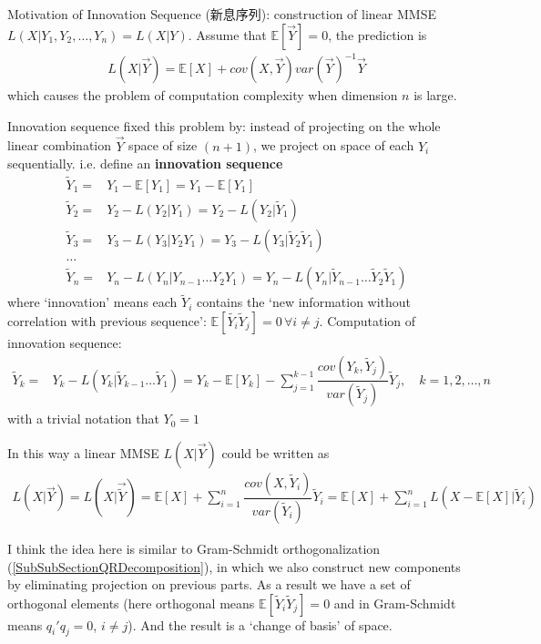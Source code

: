 Motivation of Innovation Sequence (新息序列): construction of linear MMSE $ L(X|Y_1,Y_2,\ldots,Y_n)=L(X|Y) $. Assume that $\mathbb{E}\left[ \vec{Y} \right] =0 $, the prediction is
\begin{align}
    L(X|\vec{Y})=\mathbb{E}\left[ X \right] + cov(X,\vec{Y})var(\vec{Y})^{-1}\vec{Y}
\end{align}
which causes the problem of computation complexity when dimension $ n $ is large. 

Innovation sequence fixed this problem by: instead of projecting on the whole linear combination $ \vec{Y} $ space of size $ (n+1) $, we project on space of each $ Y_i $ sequentially. i.e. define an \textbf{innovation sequence} 
\begin{align}
    \tilde{Y}_1=&Y_1-\mathbb{E}\left[ Y_1 \right] = Y_1 - \mathbb{E}\left[ Y_1 \right] \\
    \tilde{Y}_2=&Y_2-L(Y_2|Y_1) = Y_2-L(Y_2|\tilde{Y}_1)\\
    \tilde{Y}_3=&Y_3-L(Y_3|Y_2Y_1)= Y_3-L(Y_3|\tilde{Y}_2\tilde{Y}_1)\\
    \ldots&\\
    \tilde{Y}_n=&Y_n-L(Y_n|Y_{n-1}\ldots Y_2Y_1)=Y_n-L(Y_n|\tilde{Y}_{n-1}\ldots \tilde{Y}_2\tilde{Y}_1)
\end{align}
where `innovation' means each $ \tilde{Y}_i $ contains the `new information without correlation with previous sequence': $ \mathbb{E}\left[ \tilde{Y_i}\tilde{Y}_j \right]=0\,\forall i\neq j  $. Computation of innovation sequence:
\begin{align}
     \tilde{Y}_k=&Y_k-L(Y_k|\tilde{Y}_{k-1}\ldots \tilde{Y}_1)=Y_k-\mathbb{E}\left[ Y_k \right] -\sum_{j=1}^{k-1}\dfrac{cov(Y_k,\tilde{Y}_{j})}{var(\tilde{Y}_{j})}\tilde{Y}_j,\quad k=1,2,\ldots,n
\end{align}
with a trivial notation that $ Y_{0}=1 $

In this way a linear MMSE $ L(X|\vec{Y}) $ could be written as
\begin{align}
    L(X|\vec{Y})=L(X|\vec{\tilde{Y}})= \mathbb{E}\left[ X \right] +\sum_{i=1}^n \dfrac{cov(X,\tilde{Y}_i)}{var(\tilde{Y}_i)}\tilde{Y}_i=\mathbb{E}\left[ X \right] +\sum_{i=1}^n L\left(X-\mathbb{E}\left[ X \right] |\tilde{Y}_i\right)
\end{align}


I think the idea here is similar to Gram-Schmidt orthogonalization (\autoref{SubSubSectionQRDecomposition}), in which we also construct new components by eliminating projection on previous parts. As a result we have a set of orthogonal elements (here orthogonal means $ \mathbb{E}\left[ \tilde{Y}_i\tilde{Y}_j \right]=0  $ and in Gram-Schmidt means $ q_i'q_j = 0 $, $ i\neq j $). And the result is a `change of basis' of space.





